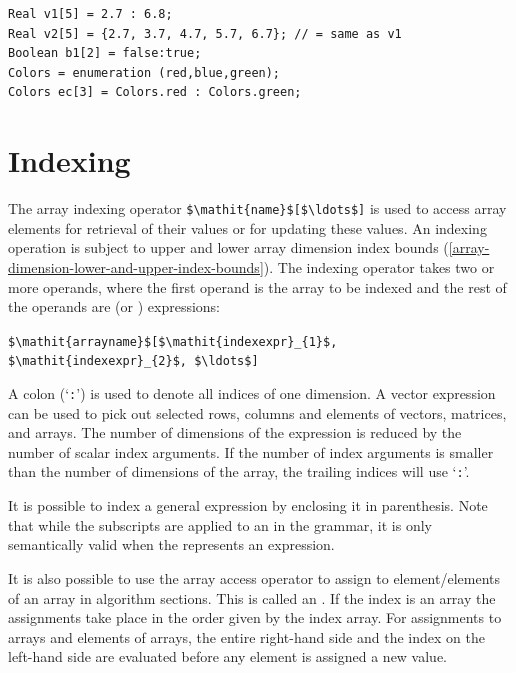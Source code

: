 \begin{example}
\begin{lstlisting}[language=modelica]
Real v1[5] = 2.7 : 6.8;
Real v2[5] = {2.7, 3.7, 4.7, 5.7, 6.7}; // = same as v1
Boolean b1[2] = false:true;
Colors = enumeration (red,blue,green);
Colors ec[3] = Colors.red : Colors.green;
\end{lstlisting}
\end{example}

\section{Indexing}\label{array-indexing}\label{indexing}

The array indexing operator \lstinline!$\mathit{name}$[$\ldots$]! is used to access array elements for retrieval of their values or for updating these values.
An indexing operation is subject to upper and lower array dimension index bounds (\cref{array-dimension-lower-and-upper-index-bounds}).
The indexing operator takes two or more operands, where the first operand is the array to be indexed and the rest of the operands are  (or ) expressions:

\lstinline!$\mathit{arrayname}$[$\mathit{indexexpr}_{1}$, $\mathit{indexexpr}_{2}$, $\ldots$]!

A colon (`\lstinline!:!') is used to denote all indices of one dimension.
A vector expression can be used to pick out selected rows, columns and elements of vectors, matrices, and arrays.
The number of dimensions of the expression is reduced by the number of scalar index arguments.
If the number of index arguments is smaller than the number of dimensions of the array, the trailing indices will use `\lstinline!:!'.

It is possible to index a general expression by enclosing it in parenthesis.
Note that while the subscripts are applied to an  in the grammar, it is only semantically valid when the  represents an expression.

It is also possible to use the array access operator to assign to element/elements of an array in algorithm sections.
This is called an .
If the index is an array the assignments take place in the order given by the index array.
For assignments to arrays and elements of arrays, the entire right-hand side and the index on the left-hand side are evaluated before any element is assigned a new value.

